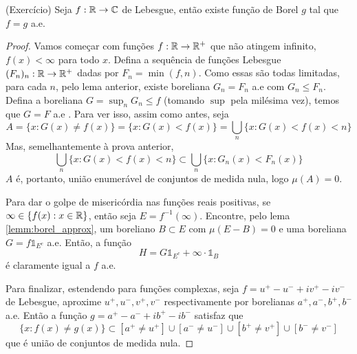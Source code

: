 \begin{lemma}
    (Exercício)
    Seja $f : \mathbb{R} \rightarrow \mathbb{C}$ de Lebesgue, então existe função de Borel $g$ tal que 
    $f = g$ a.e.
\end{lemma}
\begin{proof}
    Vamos começar com funções $f : \mathbb{R} \rightarrow \mathbb{R}^+$ que não atingem infinito, $f(x) < \infty$ para todo $x$.
    Defina a sequência de funções Lebesgue $(F_n)_n : \mathbb{R} \rightarrow \mathbb{R}^+$ dadas por $F_n = \min(f,n)$. Como essas são
    todas limitadas, para cada $n$, pelo lema anterior, existe boreliana $G_n = F_n$ a.e com $G_n \leq F_n$.
    Defina a boreliana $G = \sup_n G_n \leq f$ (tomando $\sup$ pela milésima vez), temos que $G = F$ a.e .
    Para ver isso, assim como antes, seja 
    $$A = \{x : G(x) \neq f(x)\} = \{x : G(x) < f(x)\} = \bigcup_n \{x : G(x) < f(x) < n\}$$
    Mas, semelhantemente à prova anterior,
    $$\bigcup_n \{x : G(x) < f(x) < n\} \subset \bigcup_n \{x : G_n(x) < F_n(x)\}$$
    $A$ é, portanto, união enumerável de conjuntos de medida nula, logo $\mu(A) = 0$.

    Para dar o golpe de misericórdia nas funções reais positivas, se $\infty \in \{f(x) : x \in \mathbb{R}\}$, então seja $E = f^{-1}(\infty)$.
    Encontre, pelo lema \ref{lemm:borel_approx}, um boreliano $B \subset E$ com $\mu(E - B) = 0$ e uma boreliana 
    $G = f\mathds{1}_{E^c}$ a.e. Então, a função 
    $$H = G\mathds{1}_{E^c}  + \infty \cdot \mathds{1}_{B}$$
    é claramente igual a $f$ a.e.

    Para finalizar, estendendo para funções complexas, seja $f = u^+ - u^- + iv^+ - iv^-$ de Lebesgue,
    aproxime $u^+, u^-, v^+, v^-$ respectivamente por borelianas $a^+, a^-, b^+, b^-$ a.e. Então
    a função $g = a^+ - a^- + ib^+ - ib^-$ satisfaz que 
    $$\{x : f(x) \neq g(x)\} \subset [a^+ \neq u^+] \cup [a^- \neq u^-] \cup [b^+ \neq v^+] \cup [b^- \neq v^-] $$
    que é união de conjuntos de medida nula.
\end{proof}

